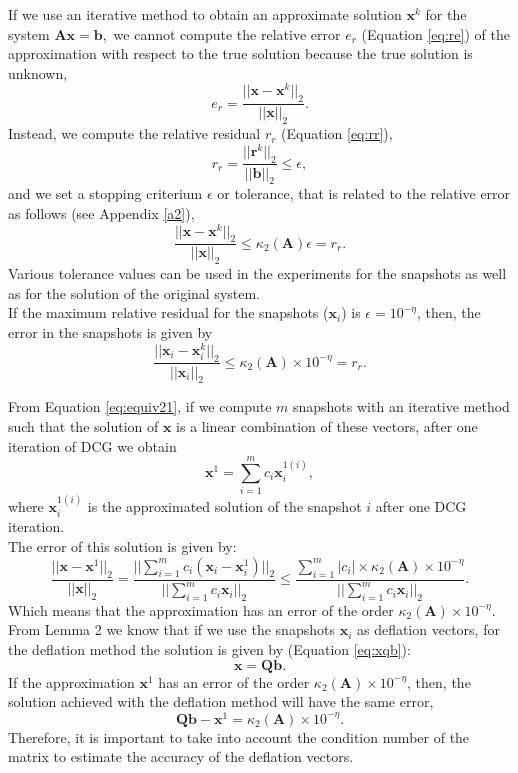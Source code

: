 \documentclass[12pt]{article}
\numberwithin{equation}{section}
\begin{document}
If we use an iterative method to obtain an approximate solution $\mathbf{x}^k$ for the system $\mathbf{A}\mathbf{x}=\mathbf{b},$ we cannot compute the relative error $e_r$ (Equation \eqref{eq:re}) of the approximation with respect to the true solution because the true solution is unknown, 
\begin{equation}\label{eq:re}
 e_r=\frac{||\mathbf{x}-\mathbf{x}^k||_2}{||\mathbf{x}||_2}.
\end{equation}
Instead, we compute the relative residual $r_r$ (Equation \eqref{eq:rr}), 
\begin{equation}\label{eq:rr}
r_r= \frac{||\mathbf{r}^k||_2}{||\mathbf{b}||_2}\leq \epsilon,
\end{equation}
and we set a stopping criterium $\epsilon$ or tolerance, that is related to the relative error as follows \cite{Saad03} (see Appendix \ref{a2}),
$$\frac{||\mathbf{x}-\mathbf{x}^k||_2}{||\mathbf{x}||_2}\leq \kappa_2(\mathbf{A}) \epsilon=r_r.$$
Various tolerance values can be used in the experiments for the snapshots as well as for the solution of the original system. \\
If the maximum relative residual for the snapshots ($\mathbf{x}_i$) is $\epsilon=10^{-\eta}$, then, the error in the snapshots is given by
$$\frac{||\mathbf{x}_i-\mathbf{x}_i^k||_2}{||\mathbf{x}_i||_2}\leq \kappa_2(\mathbf{A})\times 10^{-\eta}=r_r.$$

From Equation \eqref{eq:equiv21}, if we compute $m$ snapshots with an iterative method such that the solution of $\mathbf{x}$ is a linear combination of these vectors, after one iteration of DCG we obtain
$$\mathbf{x}^{1}=\sum_{i=1}^m {c}_i\mathbf{x}_i^{1(i)},$$
where $\mathbf{x}_i^{1(i)}$ is the approximated solution of the snapshot $i$ after one DCG iteration.\\ 
The error of this solution is given by:
$$\frac{||\mathbf{x}-\mathbf{x}^1||_2}{||\mathbf{x}||_2}=
\frac{||\sum_{i=1}^m {c}_i(\mathbf{x}_i-\mathbf{x}_i^{1})||_2}{||\sum_{i=1}^m {c}_i\mathbf{x}_i||_2}\leq
\frac{\sum_{i=1}^m| {c}_i|\times \kappa_2(\mathbf{A})\times 10^{-\eta}}{||\sum_{i=1}^m {c}_i\mathbf{x}_i||_2}.
$$
Which means that the approximation has an error of the order $\kappa_2(\mathbf{A})\times10^{-\eta}.$
\\From Lemma 2 we know that if we use the snapshots $\mathbf{x}_i$ as deflation vectors, for the deflation method the solution is given by (Equation \eqref{eq:xqb}): $$\mathbf{x}=\mathbf{Q}\mathbf{b}.$$ 
If the approximation $\mathbf{x}^1$ has an error of the order $\kappa_2(\mathbf{A})\times10^{-\eta}$, then, the solution achieved with the deflation method will have the same error, 
$$\mathbf{Q}\mathbf{b}-\mathbf{x}^1=\kappa_2(\mathbf{A})\times10^{-\eta}.$$
Therefore, it is important to take into account the condition number of the matrix to estimate the accuracy of the deflation vectors.
\end{document}
